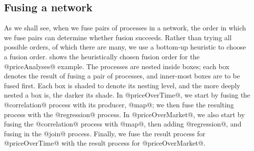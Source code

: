 

\subsection{Fusing a network}
\label{ss:Fusing:a:network}


As we shall see, when we fuse pairs of processes in a network, the order in which we fuse pairs can determine whether fusion succeeds.
Rather than trying all possible orders, of which there are many, we use a bottom-up heuristic to choose a fusion order.
 shows the heuristically chosen fusion order for the @priceAnalyses@ example.
The processes are nested inside boxes; each box denotes the result of fusing a pair of processes, and inner-most boxes are to be fused first.
Each box is shaded to denote its nesting level, and the more deeply nested a box is, the darker its shade.
In @priceOverTime@, we start by fusing the @correlation@ process with its producer, @map@; we then fuse the resulting process with the @regression@ process.
In @priceOverMarket@, we also start by fusing the @correlation@ process with @map@, then adding @regression@, and fusing in the @join@ process.
Finally, we fuse the result process for @priceOverTime@ with the result process for @priceOverMarket@.


